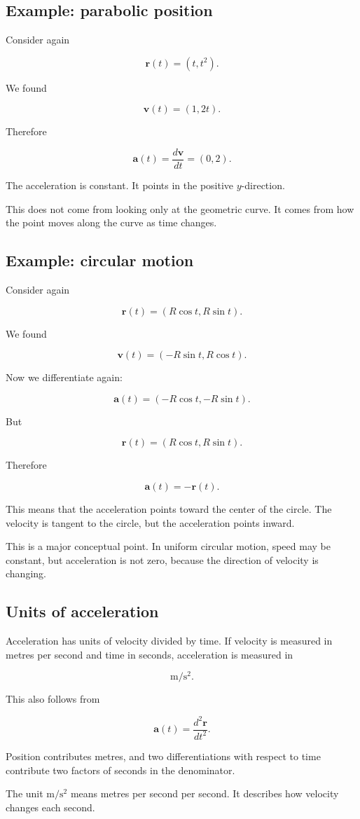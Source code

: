 \subsection{Example: parabolic position}

Consider again

\[
\mathbf{r}(t)=(t,t^2).
\]

We found

\[
\mathbf{v}(t)=(1,2t).
\]

Therefore

\[
\mathbf{a}(t)
=
\frac{d\mathbf{v}}{dt}
=
(0,2).
\]

The acceleration is constant. It points in the positive \(y\)-direction.

This does not come from looking only at the geometric curve. It comes from how the point moves along the curve as time changes.

\subsection{Example: circular motion}

Consider again

\[
\mathbf{r}(t)=(R\cos t,R\sin t).
\]

We found

\[
\mathbf{v}(t)=(-R\sin t,R\cos t).
\]

Now we differentiate again:

\[
\mathbf{a}(t)
=
(-R\cos t,-R\sin t).
\]

But

\[
\mathbf{r}(t)=(R\cos t,R\sin t).
\]

Therefore

\[
\mathbf{a}(t)=-\mathbf{r}(t).
\]

This means that the acceleration points toward the center of the circle. The velocity is tangent to the circle, but the acceleration points inward.

This is a major conceptual point. In uniform circular motion, speed may be constant, but acceleration is not zero, because the direction of velocity is changing.

\subsection{Units of acceleration}

Acceleration has units of velocity divided by time. If velocity is measured in metres per second and time in seconds, acceleration is measured in

\[
\mathrm{m/s^2}.
\]

This also follows from

\[
\mathbf{a}(t)=\frac{d^2\mathbf{r}}{dt^2}.
\]

Position contributes metres, and two differentiations with respect to time contribute two factors of seconds in the denominator.

The unit \(\mathrm{m/s^2}\) means metres per second per second. It describes how velocity changes each second.
